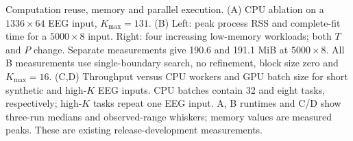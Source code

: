 Computation reuse, memory and parallel execution. (A) CPU ablation on a $1336\times64$ EEG input, $K_{\max}=131$. (B) Left: peak process RSS and complete-fit time for a $5000\times8$ input. Right: four increasing low-memory workloads; both $T$ and $P$ change. Separate measurements give 190.6 and 191.1 MiB at $5000\times8$. All B measurements use single-boundary search, no refinement, block size zero and $K_{\max}=16$. (C,D) Throughput versus CPU workers and GPU batch size for short synthetic and high-$K$ EEG inputs. CPU batches contain 32 and eight tasks, respectively; high-$K$ tasks repeat one EEG input. A, B runtimes and C/D show three-run medians and observed-range whiskers; memory values are measured peaks. These are existing release-development measurements.
